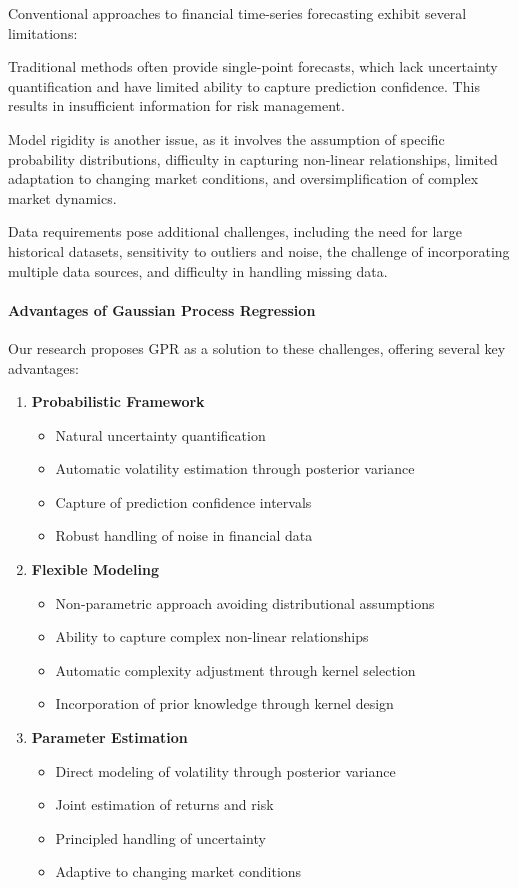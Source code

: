 Conventional approaches to financial time-series forecasting exhibit several limitations:

Traditional methods often provide single-point forecasts, which lack uncertainty quantification and have limited ability to capture prediction confidence. This results in insufficient information for risk management.

Model rigidity is another issue, as it involves the assumption of specific probability distributions, difficulty in capturing non-linear relationships, limited adaptation to changing market conditions, and oversimplification of complex market dynamics.

Data requirements pose additional challenges, including the need for large historical datasets, sensitivity to outliers and noise, the challenge of incorporating multiple data sources, and difficulty in handling missing data.

\paragraph{Advantages of Gaussian Process Regression}
Our research proposes \ac{GPR} as a solution to these challenges, offering several key advantages:

\begin{enumerate}
    \item \textbf{Probabilistic Framework}
    \begin{itemize}
        \item Natural uncertainty quantification
        \item Automatic volatility estimation through posterior variance
        \item Capture of prediction confidence intervals
        \item Robust handling of noise in financial data
    \end{itemize}

    \item \textbf{Flexible Modeling}
    \begin{itemize}
        \item Non-parametric approach avoiding distributional assumptions
        \item Ability to capture complex non-linear relationships
        \item Automatic complexity adjustment through kernel selection
        \item Incorporation of prior knowledge through kernel design
    \end{itemize}

    \item \textbf{Parameter Estimation}
    \begin{itemize}
        \item Direct modeling of volatility through posterior variance
        \item Joint estimation of returns and risk
        \item Principled handling of uncertainty
        \item Adaptive to changing market conditions
    \end{itemize}
\end{enumerate}

